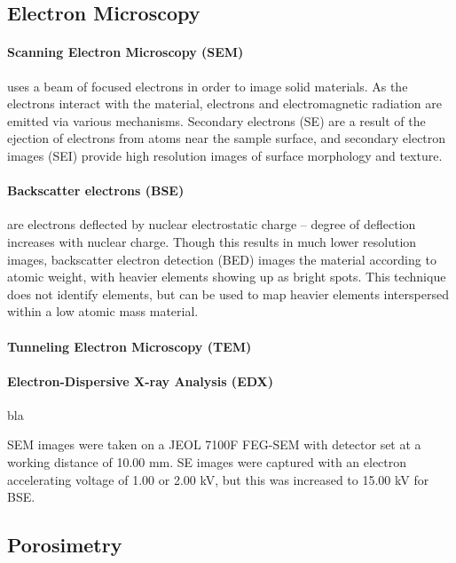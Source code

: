 \subsection{Electron Microscopy}
\paragraph{Scanning Electron Microscopy (SEM)} uses a beam of focused electrons in order to image solid materials. As the electrons interact with the material, electrons and electromagnetic radiation are emitted via various mechanisms. Secondary electrons (SE) are a result of the ejection of electrons from atoms near the sample surface, and secondary electron images (SEI) provide high resolution images of surface morphology and texture.\citep{Goldstein2017Scanning} 

\paragraph{Backscatter electrons (BSE)} are electrons deflected by nuclear electrostatic charge – degree of deflection increases with nuclear charge. Though this results in much lower resolution images, backscatter electron detection (BED) images the material according to atomic weight, with heavier elements showing up as bright spots. This technique does not identify elements, but can be used to map heavier elements interspersed within a low atomic mass material.\citep{Goldstein2017Scanning}

\paragraph{Tunneling Electron Microscopy (TEM)}

\paragraph{Electron-Dispersive X-ray Analysis (EDX)} bla

\par SEM images were taken on a JEOL 7100F FEG-SEM with detector set at a working distance of 10.00 mm. SE images were captured with an electron accelerating voltage of 1.00 or 2.00 kV, but this was increased to 15.00 kV for BSE.

\subsection{Porosimetry}

